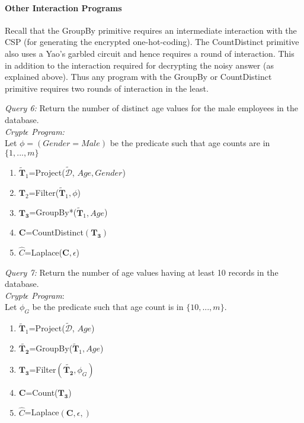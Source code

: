 \paragraph{\textbf{Other Interaction Programs}}
Recall that the \textsf{GroupBy} primitive requires an intermediate interaction with the \textsf{CSP} (for generating the encrypted one-hot-coding). The \textsf{CountDistinct} primitive also uses a Yao's garbled circuit and hence requires a round of interaction. This in addition to the interaction required for decrypting the noisy answer (as explained above). Thus any program with the \textsf{GroupBy} or \textsf{CountDistinct} primitive requires two rounds of interaction in the least. 
\begin{exmp}\textit{Query 6:} Return the number of distinct age values for the male employees in the database. \\ \textit{Crypt$\epsilon$ Program:} \\Let  $\phi=(Gender=Male)$ be the predicate such that age counts are in $\{1,...,m\}$ \begin{enumerate}\item $\mathbf{\tilde{T}}_1$=\textsf{Project}($\boldsymbol{\tilde{\mathcal{D}}}$, $Age,Gender$) \item $\mathbf{T}_2$=\textsf{Filter}($\mathbf{\tilde{T}}_1,\phi$) \item $\mathbf{T_3}$=\textsf{GroupBy*}($\mathbf{\tilde{T}}_1,Age$)\item $\mathbf{C}$=\textsf{CountDistinct}$(\mathbf{T_3})$\item $\hat{C}$=\textsf{Laplace}($\mathbf{C},\epsilon$)\end{enumerate}\end{exmp} \begin{exmp}\textit{Query 7:} Return the number of  age values having at least 10 records in the database. \\ \textit{Crypt$\epsilon$ Program}:\\ Let $\phi_G$ be the predicate such that age count is in $\{10,...,m\}$. \begin{enumerate}\item $\mathbf{\tilde{T}}_1$=\textsf{Project}($\boldsymbol{\tilde{\mathcal{D}}}$, $Age$) \item $\mathbf{\tilde{T_2}}$=\textsf{GroupBy}($\mathbf{\tilde{T}}_1,Age$)\item $\mathbf{T_3}$=\textsf{Filter}$(\mathbf{\tilde{T_2}},\phi_G)$\item $\mathbf{C}$=\textsf{Count}($\mathbf{T_3}$)\item $\hat{C}$=\textsf{Laplace}$(\mathbf{C},\epsilon,)$\end{enumerate}\end{exmp}